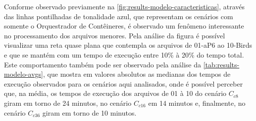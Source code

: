 \documentclass[english,brazilian]{UNISINOSmonografia} %
\begin{document}
Conforme observado previamente na \autoref{fig:results-modelo-caracteristicas}, através das linhas pontilhadas de tonalidade azul, que representam os cenários com somente o Orquestrador de Contêineres, é observado um fenômeno interessante no processamento dos arquivos menores.
%
Pela análise da figura é possível visualizar uma reta quase plana que contempla os arquivos de 01-aP6 ao 10-Birds e que se mantém com um tempo de execução entre 10\% à 20\% do tempo total.
%
Este comportamento também pode ser observado pela análise da \autoref{tab:results-modelo-avgs}, que mostra em valores absolutos as medianas dos tempos de execução observados para os cenários aqui analisados, onde é possível perceber que, na média, os tempos de execução dos arquivos de 01 à 10 do cenário $C_{c8}$ giram em torno de 24 minutos, no cenário $C_{c16}$ em 14 minutos e, finalmente, no cenário $C_{c36}$ giram em torno de 10 minutos.
\end{document}
